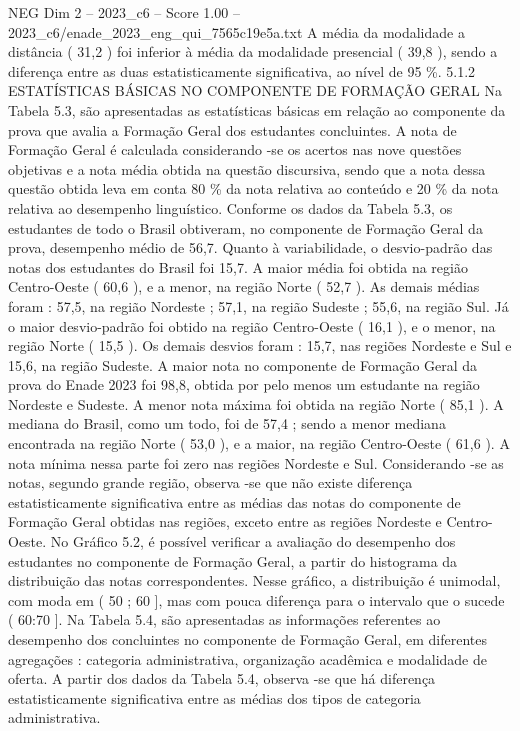 \begin{textsample}{NEG Dim 2 – 2023\_c6 – Score 1.00 – 2023\_c6/enade\_2023\_eng\_qui\_7565c19e5a.txt}
A média da modalidade a distância ( 31,2 ) foi inferior à média da modalidade presencial ( 39,8 ), sendo a diferença entre as duas estatisticamente significativa, ao nível de 95 \%. 5.1.2 ESTATÍSTICAS BÁSICAS NO COMPONENTE DE FORMAÇÃO GERAL Na Tabela 5.3, são apresentadas as estatísticas básicas em relação ao componente da prova que avalia a Formação Geral dos estudantes concluintes.
A nota de Formação Geral é calculada considerando -se os acertos nas nove questões objetivas e a nota média obtida na questão discursiva, sendo que a nota dessa questão obtida leva em conta 80 \% da nota relativa ao conteúdo e 20 \% da nota relativa ao desempenho linguístico.
Conforme os dados da Tabela 5.3, os estudantes de todo o Brasil obtiveram, no componente de Formação Geral da prova, desempenho médio de 56,7.
Quanto à variabilidade, o desvio-padrão das notas dos estudantes do Brasil foi 15,7.
A maior média foi obtida na região Centro-Oeste ( 60,6 ), e a menor, na região Norte ( 52,7 ).
As demais médias foram : 57,5, na região Nordeste ; 57,1, na região Sudeste ; 55,6, na região Sul.
Já o maior desvio-padrão foi obtido na região Centro-Oeste ( 16,1 ), e o menor, na região Norte ( 15,5 ).
Os demais desvios foram : 15,7, nas regiões Nordeste e Sul e 15,6, na região Sudeste.
A maior nota no componente de Formação Geral da prova do Enade 2023 foi 98,8, obtida por pelo menos um estudante na região Nordeste e Sudeste.
A menor nota máxima foi obtida na região Norte ( 85,1 ).
A mediana do Brasil, como um todo, foi de 57,4 ; sendo a menor mediana encontrada na região Norte ( 53,0 ), e a maior, na região Centro-Oeste ( 61,6 ).
A nota mínima nessa parte foi zero nas regiões Nordeste e Sul.
Considerando -se as notas, segundo grande região, observa -se que não existe diferença estatisticamente significativa entre as médias das notas do componente de Formação Geral obtidas nas regiões, exceto entre as regiões Nordeste e Centro-Oeste.
No Gráfico 5.2, é possível verificar a avaliação do desempenho dos estudantes no componente de Formação Geral, a partir do histograma da distribuição das notas correspondentes.
Nesse gráfico, a distribuição é unimodal, com moda em ( 50 ; 60 ], mas com pouca diferença para o intervalo que o sucede ( 60:70 ].
Na Tabela 5.4, são apresentadas as informações referentes ao desempenho dos concluintes no componente de Formação Geral, em diferentes agregações : categoria administrativa, organização acadêmica e modalidade de oferta.
A partir dos dados da Tabela 5.4, observa -se que há diferença estatisticamente significativa entre as médias dos tipos de categoria administrativa.

\end{textsample}
